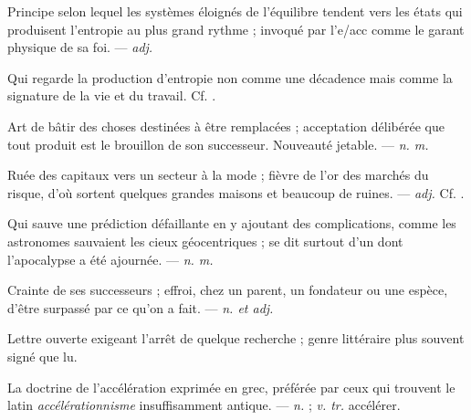  Principe selon lequel les systèmes éloignés de l'équilibre tendent vers les états qui produisent l'entropie au plus grand rythme ; invoqué par l'e/acc comme le garant physique de sa foi. ---  \textit{adj.}

 Qui regarde la production d'entropie non comme une décadence mais comme la signature de la vie et du travail.  Cf. .

  Art de bâtir des choses destinées à être remplacées ; acceptation délibérée que tout produit est le brouillon de son successeur.   Nouveauté jetable.  ---  \textit{n. m.}

 Ruée des capitaux vers un secteur à la mode ; fièvre de l'or des marchés du risque, d'où sortent quelques grandes maisons et beaucoup de ruines.   ---  \textit{adj.} Cf. .

  Qui sauve une prédiction défaillante en y ajoutant des complications, comme les astronomes sauvaient les cieux géocentriques ; se dit surtout d'un  dont l'apocalypse a été ajournée. ---  \textit{n. m.}

 Crainte de ses successeurs ; effroi, chez un parent, un fondateur ou une espèce, d'être surpassé par ce qu'on a fait. ---  \textit{n. et adj.}

 Lettre ouverte exigeant l'arrêt de quelque recherche ; genre littéraire plus souvent signé que lu.  

 La doctrine de l'accélération exprimée en grec, préférée par ceux qui trouvent le latin \textit{accélérationnisme} insuffisamment antique. ---  \textit{n.} ;  \textit{v. tr.} accélérer.

